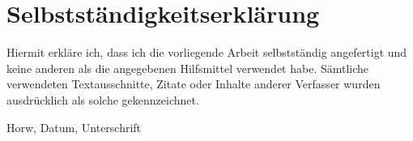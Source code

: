 \section{Selbstständigkeitserklärung}
 
Hiermit erkläre ich, dass ich die vorliegende Arbeit selbstständig angefertigt und keine anderen als die angegebenen Hilfsmittel verwendet habe. Sämtliche verwendeten Textausschnitte, Zitate oder Inhalte anderer Verfasser wurden ausdrücklich als solche gekennzeichnet.

\vspace{1.5 cm} 
 
Horw, Datum, Unterschrift